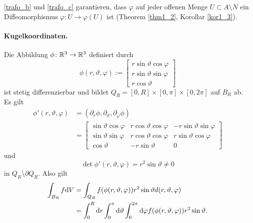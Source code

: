 \begin{rem}
	\ref{trafo_b} und \ref{trafo_c} garantieren, dass $\varphi$ auf jeder offenen Menge $U \subset A \setminus N$ ein Diffeomorphismus $\varphi \colon U \to \varphi(U)$ ist (Theorem \ref{thm1_2}, Korollar \ref{kor1_3}).
\end{rem}
\paragraph{Kugelkoordinaten. } Die Abbildung $\phi \colon \mathbb{R}^3 \to \mathbb{R}^3$ definiert durch
\[\phi(r, \vartheta, \varphi) := \begin{bmatrix}
	r \sin\vartheta\cos\varphi\\
	r \sin\vartheta\sin\varphi\\
	r\cos\vartheta
\end{bmatrix}\]
ist stetig differenzierbar und bildet $Q_R = [0,R] \times [0,\pi] \times [0,2\pi]$ auf $B_R$ ab. Es gilt
\begin{align*}
	\phi'(r, \vartheta, \varphi) &= (\partial_r \phi, \partial_\vartheta, \partial_\varphi \phi)\\
	&= \begin{bmatrix}
		\sin\vartheta\cos\varphi & r\cos\vartheta\cos\varphi & -r\sin\vartheta\sin\varphi\\
		\sin\vartheta\sin\varphi & r\cos\vartheta\cos\varphi & r\sin\vartheta\cos\varphi\\
		\cos\vartheta & -r\sin\vartheta & 0
	\end{bmatrix}
\end{align*}
und 
\[\det \phi'(r, \vartheta, \varphi) = r^2 \sin \vartheta \neq 0\]
in $Q_R \setminus \partial Q_R$. Also gilt
\begin{align*}
	\int_{B_R} f \mathrm{d} V &= \int_{Q_R} f(\phi(r, \vartheta, \varphi)) r^2 \sin\vartheta d(r,\vartheta,\varphi)\\
	&= \int_0^R \mathrm{d} r \int_0^\pi \mathrm{d}\vartheta \int_0^{2\pi} \mathrm{d}\varphi f(\phi(r,\vartheta,\varphi)) r^2 \sin \vartheta.
\end{align*}